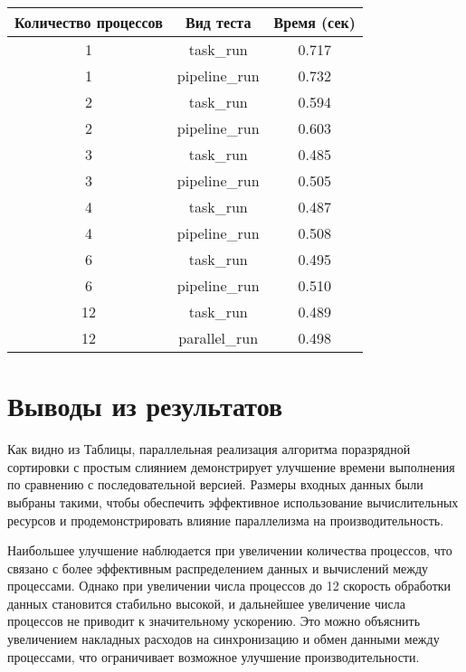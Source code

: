 \documentclass[12pt]{article}
\begin{document}
	\begin{table}[htbp]
		\centering
		\begin{tabular}{|c|c|c|}
			\hline
			\textbf{Количество процессов} & \textbf{Вид теста} & \textbf{Время (сек)} \\ \hline
			1 & task\_run & 0.717 \\ \hline
			1 & pipeline\_run & 0.732 \\ \hline
			2 & task\_run & 0.594 \\ \hline
			2 & pipeline\_run & 0.603 \\ \hline
			3 & task\_run & 0.485 \\ \hline
			3 & pipeline\_run & 0.505 \\ \hline
			4 & task\_run & 0.487 \\ \hline
			4 & pipeline\_run & 0.508 \\ \hline
			6 & task\_run & 0.495 \\ \hline
			6 & pipeline\_run & 0.510 \\ \hline
			12 & task\_run & 0.489 \\ \hline
			12 & parallel\_run & 0.498 \\ \hline
		\end{tabular}
		\label{tab:performance_results}
	\end{table}
	
	\newpage
	
	\section*{Выводы из результатов}
	
	\hspace*{1.25em}Как видно из Таблицы, параллельная реализация алгоритма поразрядной сортировки с простым слиянием демонстрирует улучшение времени выполнения по сравнению с последовательной версией. Размеры входных данных были выбраны такими, чтобы обеспечить эффективное использование вычислительных ресурсов и продемонстрировать влияние параллелизма на производительность.
	
	Наибольшее улучшение наблюдается при увеличении количества процессов, что связано с более эффективным распределением данных и вычислений между процессами. Однако при увеличении числа процессов до 12 скорость обработки данных становится стабильно высокой, и дальнейшее увеличение числа процессов не приводит к значительному ускорению. Это можно объяснить увеличением накладных расходов на синхронизацию и обмен данными между процессами, что ограничивает возможное улучшение производительности.
	
\end{document}
